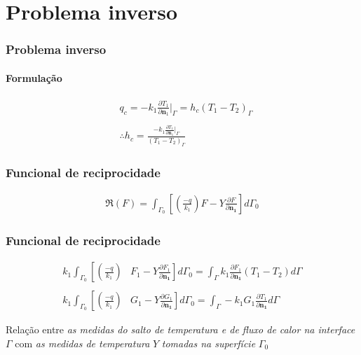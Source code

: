 \documentclass{beamer}
\begin{document}
\section{Problema inverso}

\begin{frame}
	\frametitle{Problema inverso}
	\framesubtitle{Formulação}
	\begin{align*}
	& q_c = -k_1\frac{\partial T_1}{\partial \mathbf{n}_1}\bigg|_\Gamma
	=
	h_c(T_1 - T_2)_\Gamma \\ \\
	& \therefore h_c = \frac{-k_1\displaystyle\frac{\partial T_1}{\partial \mathbf{n}_1}\bigg|_\Gamma}{(T_1 - T_2)_\Gamma}
	\end{align*}
\end{frame}

\begin{frame}
	\frametitle{Funcional de reciprocidade}
	\begin{definition}{}
		\begin{align*}
		\Re(F) = \int_{\Gamma_0}\left[\left(\frac{-q}{k_1}\right)F - Y\frac{\partial F}{\partial\mathbf{n_1}}\right]d\Gamma_0
		\end{align*}
	\end{definition}
	
	\begin{center}
	\end{center}
	
	\begin{center}
	\end{center}	
\end{frame}

\begin{frame}
	\label{slide_fr}
	\frametitle{Funcional de reciprocidade}
	
	\begin{corollary}
		\begin{align*}
		k_1\int_{\Gamma_0}\left[\left(\frac{-q}{k_1}\right)\right. & \left.F_1 - Y\frac{\partial F_1}{\partial\mathbf{n_1}}\right]d\Gamma_0
		=\int_\Gamma k_1 \frac{\partial F_1}{\partial\mathbf{n_1}}\left(T_1 - T_2\right)d\Gamma
		\label{identidade_T} \\ \nonumber \\
		k_1\int_{\Gamma_0}\left[\left(\frac{-q}{k_1}\right)\right. & \left.G_1 -  Y\frac{\partial G_1}{\partial\mathbf{n_1}}\right]d\Gamma_0
		= \int_\Gamma -k_1 G_1 \frac{\partial T_1}{\partial\mathbf{n_1}}d\Gamma
		\end{align*}
	\end{corollary}
	
	\begin{center}
	\end{center}
	
	\begin{alertblock}{}
	Relação entre \textit{as medidas
		do salto de temperatura e de fluxo de calor na interface} $\Gamma$ com \textit{as medidas de temperatura} $Y$ \textit{tomadas na superfície} $\Gamma_0$
	\end{alertblock}
	\hyperlink{slide_produto_interno}{\beamergotobutton{}}
\end{frame}
\end{document}
